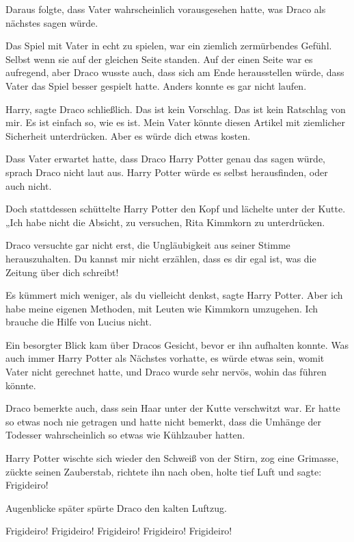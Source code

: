 Daraus folgte, dass Vater wahrscheinlich vorausgesehen hatte, was Draco als
nächstes sagen würde.

Das Spiel mit Vater in echt zu spielen, war ein ziemlich zermürbendes Gefühl.
Selbst wenn sie auf der gleichen Seite standen. Auf der einen Seite war es
aufregend, aber Draco wusste auch, dass sich am Ende herausstellen würde, dass
Vater das Spiel besser gespielt hatte. Anders konnte es gar nicht laufen.

\glqq Harry\grqq{}, sagte Draco schließlich. \glqq Das ist kein Vorschlag. Das
ist kein Ratschlag von mir. Es ist einfach so, wie es ist. Mein Vater könnte
diesen Artikel mit ziemlicher Sicherheit unterdrücken. Aber es würde dich etwas
kosten.\grqq{}

Dass Vater erwartet hatte, dass Draco Harry Potter genau das sagen würde, sprach
Draco nicht laut aus. Harry Potter würde es selbst herausfinden, oder auch
nicht.

Doch stattdessen schüttelte Harry Potter den Kopf und lächelte unter der Kutte.
„Ich habe nicht die Absicht, zu versuchen, Rita Kimmkorn zu unterdrücken.\grqq{}

Draco versuchte gar nicht erst, die Ungläubigkeit aus seiner Stimme
herauszuhalten. \glqq Du kannst mir nicht erzählen, dass es dir egal ist, was
die Zeitung über dich schreibt!\grqq{}

\glqq Es kümmert mich weniger, als du vielleicht denkst\grqq{}, sagte Harry
Potter. \glqq Aber ich habe meine eigenen Methoden, mit Leuten wie Kimmkorn
umzugehen. Ich brauche die Hilfe von Lucius nicht.\grqq{}

Ein besorgter Blick kam über Dracos Gesicht, bevor er ihn aufhalten konnte. Was
auch immer Harry Potter als Nächstes vorhatte, es würde etwas sein, womit Vater
nicht gerechnet hatte, und Draco wurde sehr nervös, wohin das führen könnte.

Draco bemerkte auch, dass sein Haar unter der Kutte verschwitzt war. Er hatte so
etwas noch nie getragen und hatte nicht bemerkt, dass die Umhänge der Todesser
wahrscheinlich so etwas wie Kühlzauber hatten.

Harry Potter wischte sich wieder den Schweiß von der Stirn, zog eine Grimasse,
zückte seinen Zauberstab, richtete ihn nach oben, holte tief Luft und sagte:
\glqq Frigideiro!\grqq{}

Augenblicke später spürte Draco den kalten Luftzug.

\glqq Frigideiro! Frigideiro! Frigideiro! Frigideiro! Frigideiro!\grqq{}

